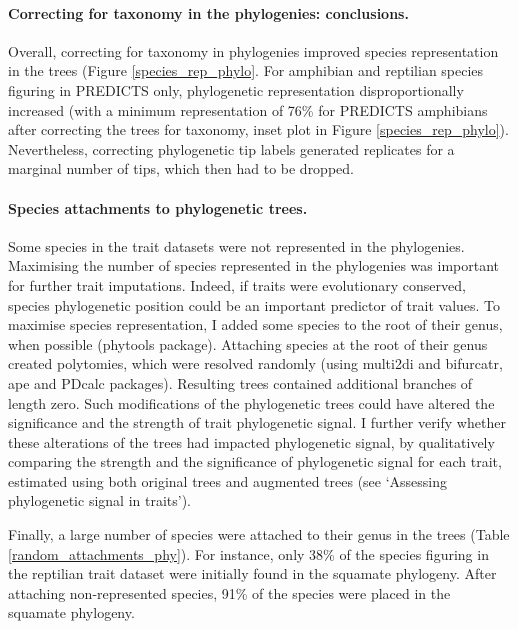 \paragraph{Correcting for taxonomy in the phylogenies: conclusions.}
Overall, correcting for taxonomy in phylogenies improved species representation in the trees (Figure \ref{species_rep_phylo}. For amphibian and reptilian species figuring in PREDICTS only, phylogenetic representation disproportionally increased (with a minimum representation of 76\% for PREDICTS amphibians after correcting the trees for taxonomy, inset plot in Figure \ref{species_rep_phylo}). Nevertheless, correcting phylogenetic tip labels generated replicates for a marginal number of tips, which then had to be dropped. 


\paragraph{Species attachments to phylogenetic trees.} Some species in the trait datasets were not represented in the phylogenies. Maximising the number of species represented in the phylogenies was important for further trait imputations. Indeed, if traits were evolutionary conserved, species phylogenetic position could be an important predictor of trait values. To maximise species representation, I added some species to the root of their genus, when possible (phytools package). Attaching species at the root of their genus created polytomies, which were resolved randomly (using multi2di and bifurcatr, ape and PDcalc packages). Resulting trees contained additional branches of length zero. Such modifications of the phylogenetic trees could have altered the significance and the strength of trait phylogenetic signal. I further verify whether these alterations of the trees had impacted phylogenetic signal, by qualitatively comparing the strength and the significance of phylogenetic signal for each trait, estimated using both original trees and augmented trees (see `Assessing phylogenetic signal in traits').

Finally, a large number of species were attached to their genus in the trees (Table \ref{random_attachments_phy}). For instance, only 38\% of the species figuring in the reptilian trait dataset were initially found in the squamate phylogeny. After attaching non-represented species, 91\% of the species were placed in the squamate phylogeny. 

